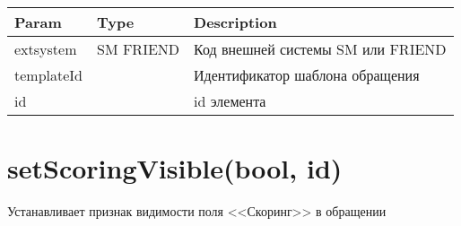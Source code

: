 \begin{longtable}[]{@{}lll@{}}
\toprule
\begin{minipage}[b]{0.30\columnwidth}\raggedright
Param\strut
\end{minipage} & \begin{minipage}[b]{0.30\columnwidth}\raggedright
Type\strut
\end{minipage} & \begin{minipage}[b]{0.30\columnwidth}\raggedright
Description\strut
\end{minipage}\tabularnewline
\midrule
\endhead
\begin{minipage}[t]{0.30\columnwidth}\raggedright
extsystem\strut
\end{minipage} & \begin{minipage}[t]{0.30\columnwidth}\raggedright
SM \textbar{} FRIEND\strut
\end{minipage} & \begin{minipage}[t]{0.30\columnwidth}\raggedright
Код внешней системы SM или FRIEND\strut
\end{minipage}\tabularnewline
\begin{minipage}[t]{0.30\columnwidth}\raggedright
templateId\strut
\end{minipage} & \begin{minipage}[t]{0.30\columnwidth}\raggedright
\strut
\end{minipage} & \begin{minipage}[t]{0.30\columnwidth}\raggedright
Идентификатор шаблона обращения\strut
\end{minipage}\tabularnewline
\begin{minipage}[t]{0.30\columnwidth}\raggedright
id\strut
\end{minipage} & \begin{minipage}[t]{0.30\columnwidth}\raggedright
\strut
\end{minipage} & \begin{minipage}[t]{0.30\columnwidth}\raggedright
id элемента\strut
\end{minipage}\tabularnewline
\bottomrule
\end{longtable}

\hypertarget{setscoringvisiblebool-id-string}{%
\section{setScoringVisible(bool, id)}\label{setscoringvisiblebool-id-string}}

Устанавливает признак видимости поля <<Скоринг>> в обращении



